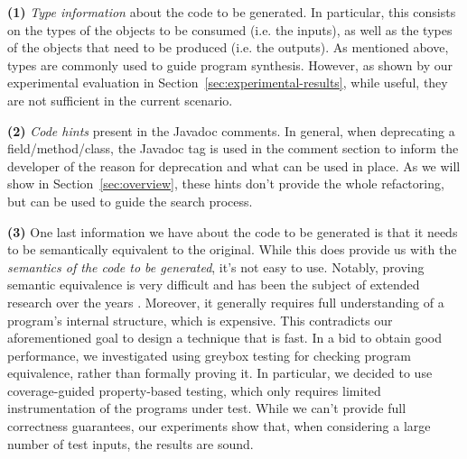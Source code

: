 \documentclass[runningheads,a4paper]{llncs}
\begin{document}
{\bf (1)} {\em Type information} about the code to be generated. In particular, this consists on the types of the objects to be consumed (i.e. the inputs), as well as the types of the objects that need to be produced (i.e. the outputs). As mentioned above, types are commonly used to guide  program synthesis. However, as shown by our experimental evaluation in Section~\ref{sec:experimental-results}, while useful, they are not sufficient in the current scenario. %

{\bf (2)} {\em Code hints} present in the Javadoc comments. In general, when deprecating a field/method/class, the  Javadoc tag is used in the
  comment section to inform the developer of the reason for deprecation and what can be used in place. As we will show in Section~\ref{sec:overview}, these hints
  don't provide the whole refactoring, but can be used to guide the search process.

  {\bf (3)} One last information we have about the code to be generated is that it needs to be semantically equivalent to the original. While this does provide us with the {\em semantics of the
  code to be generated}, it's not easy to use. 
  Notably, proving semantic equivalence is very difficult and has been the subject of extended research over the years \cite{}.
Moreover, it generally requires full understanding of a program's internal structure, which is expensive.
This contradicts our aforementioned goal to design a technique that is fast. In a bid to obtain good performance,
we investigated using greybox testing for checking program equivalence, rather than formally proving it.
In particular, we decided to use coverage-guided property-based testing, which only requires limited instrumentation of the programs under test.
While we can't provide full correctness guarantees,
our experiments show that, when considering a large number of test inputs, the results are sound.
\end{document}
